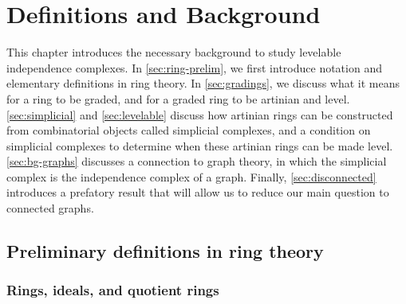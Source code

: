 
\chapter{Definitions and Background} %

\label{ch:background} %

This chapter introduces the necessary background to study levelable independence complexes. In \autoref{sec:ring-prelim}, we first introduce notation and elementary definitions in ring theory. In \autoref{sec:gradings}, we discuss what it means for a ring to be graded, and for a graded ring to be artinian and level. \autoref{sec:simplicial} and \ref{sec:levelable} discuss how artinian rings can be constructed from combinatorial objects called simplicial complexes, and a condition on simplicial complexes to determine when these artinian rings can be made level. \autoref{sec:bg-graphs} discusses a connection to graph theory, in which the simplicial complex is the independence complex of a graph. Finally, \autoref{sec:disconnected} introduces a prefatory result that will allow us to reduce our main question to connected graphs. 

\section{Preliminary definitions in ring theory} \label{sec:ring-prelim}

\subsection{Rings, ideals, and quotient rings} 

